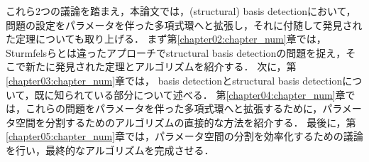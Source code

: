 \par
これら$2$つの議論を踏まえ，本論文では，(structural) \groebner{} basis detectionにおいて，問題の設定をパラメータを伴った多項式環へと拡張し，それに付随して発見された定理についても取り上げる．
まず第\ref{chapter02:chapter_num}章では，Sturmfelsらとは違ったアプローチでstructural \groebner{} basis detectionの問題を捉え，そこで新たに発見された定理とアルゴリズムを紹介する．
次に，第\ref{chapter03:chapter_num}章では，\groebner{} basis detectionとstructural \groebner{} basis detectionについて，既に知られている部分について述べる．
第\ref{chapter04:chapter_num}章では，これらの問題をパラメータを伴った多項式環へと拡張するために，パラメータ空間を分割するためのアルゴリズムの直接的な方法を紹介する．
最後に，第\ref{chapter05:chapter_num}章では，パラメータ空間の分割を効率化するための議論を行い，最終的なアルゴリズムを完成させる．